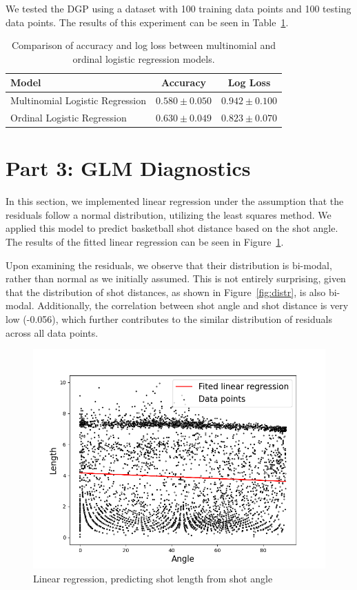 \documentclass[9pt]{IEEEtran}
\begin{document}
We tested the DGP using a dataset with 100 training data points and 100
 testing data points. The results of this experiment can be seen in 
 Table~\ref{tab:logistic_comparison}.


\begin{table}[ht]
    \centering
    \begin{tabular}{l|c|c}
    \textbf{Model} & \textbf{Accuracy} & \textbf{Log Loss} \\
    \hline
    Multinomial Logistic Regression & $0.580 \pm 0.050$ & $0.942 \pm 0.100$ \\
    Ordinal Logistic Regression     & $0.630 \pm 0.049$ & $0.823 \pm 0.070$ \\
 
    \end{tabular}
    \caption{Comparison of accuracy and log loss  between multinomial and ordinal logistic regression models.}
    \label{tab:logistic_comparison}
    \end{table}
    

\section{Part 3: GLM Diagnostics}
In this section, we implemented linear regression under the assumption that the residuals 
follow a normal distribution, utilizing the least squares method. We applied this model to 
predict basketball shot distance based on the shot angle. The results of the fitted linear 
regression can be seen in Figure~\ref{fig:lg}.

Upon examining the residuals, we observe that their distribution is bi-modal, rather than 
normal as we initially assumed. This is not entirely surprising, given that the distribution
 of shot distances, as shown in Figure~\ref{fig:distr}, is also bi-modal. Additionally, the 
 correlation between shot angle and shot distance is very low (-0.056), which further contributes
  to the similar distribution of residuals across all data points. 

  \begin{figure}[h]
    \centering
    \includegraphics[width=0.99\columnwidth]{figures/lin_reg.png}
    \caption{Linear regression, predicting shot length from shot angle}
    \label{fig:lg}
\end{figure}
\end{document}
